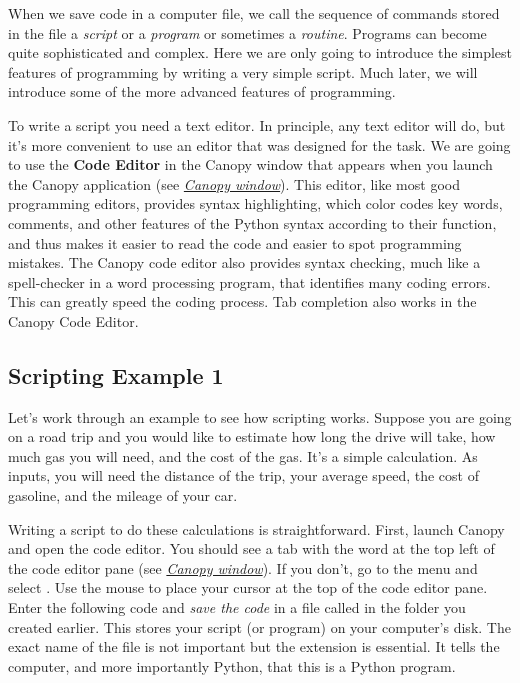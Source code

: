 \documentclass[letterpaper,10pt,english]{sphinxmanual}
\begin{document}
When we save code in a computer file, we call the sequence of commands stored in the file a \emph{script} or a \emph{program} or sometimes a \emph{routine}.  Programs can become quite sophisticated and complex.  Here we are only going to introduce the simplest features of programming by writing a very simple script.  Much later, we will introduce some of the more advanced features of programming.

To write a script you need a text editor.  In principle, any text editor will do, but it's more convenient to use an editor that was designed for the task.  We are going to use the \textbf{Code Editor} in the Canopy window that appears when you launch the Canopy application (see  {\hyperref[chap2/chap2_basics:fig-canopywindow]{\emph{Canopy window}}}).  This editor, like most good programming editors, provides syntax highlighting, which color codes key words, comments, and other features of the Python syntax according to their function, and thus makes it easier to read the code and easier to spot programming mistakes.  The Canopy code editor also provides syntax checking, much like a spell-checker in a word processing program, that identifies many coding errors.  This can greatly speed the coding process.  Tab completion also works in the Canopy Code Editor.


\subsection{Scripting Example 1}
\label{chap2/chap2_basics:chap2-scriptexmp1}\label{chap2/chap2_basics:scripting-example-1}
Let's work through an example to see how scripting works.  Suppose you are going on a road trip and you would like to estimate how long the drive will take, how much gas you will need, and the cost of the gas.  It's a simple calculation.  As inputs, you will need the distance of the trip, your average speed, the cost of gasoline, and the mileage of your car.

Writing a script to do these calculations is straightforward.  First, launch Canopy and open the code editor.  You should see a tab with the word  at the top left of the code editor pane (see {\hyperref[chap2/chap2_basics:fig-canopywindow]{\emph{Canopy window}}}).  If you don't, go to the  menu and select .  Use the mouse to place your cursor at the top of the code editor pane.  Enter the following code and \emph{save the code} in a file called  in the  folder you created earlier.  This stores your script (or program) on your computer's disk.  The exact name of the file is not important but the extension  is essential.  It tells the computer, and more importantly Python, that this is a Python program.
\end{document}
